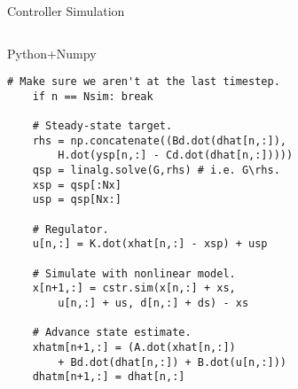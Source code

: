 \documentclass[xcolor=dvipsnames]{beamer}
\begin{document}
\begin{frame}[fragile]{Controller Simulation}
\begin{columns}[T]
\begin{column}[T]{0.45\textwidth}
\begin{block}{Python+Numpy \vphantom{/}}
\begin{lstlisting}[style=python,basicstyle=\ttfamily\fontsize{5pt}{6}\selectfont]
    # Make sure we aren't at the last timestep.
    if n == Nsim: break

    # Steady-state target.
    rhs = np.concatenate((Bd.dot(dhat[n,:]),
        H.dot(ysp[n,:] - Cd.dot(dhat[n,:]))))
    qsp = linalg.solve(G,rhs) # i.e. G\rhs.
    xsp = qsp[:Nx]
    usp = qsp[Nx:]
    
    # Regulator.
    u[n,:] = K.dot(xhat[n,:] - xsp) + usp
    
    # Simulate with nonlinear model.
    x[n+1,:] = cstr.sim(x[n,:] + xs,
        u[n,:] + us, d[n,:] + ds) - xs
    
    # Advance state estimate.
    xhatm[n+1,:] = (A.dot(xhat[n,:])
        + Bd.dot(dhat[n,:]) + B.dot(u[n,:]))
    dhatm[n+1,:] = dhat[n,:]
                       
\end{lstlisting}
\vspace{-.5em}
\end{block}
\end{column}

\end{columns}     

\end{frame}
\end{document}

